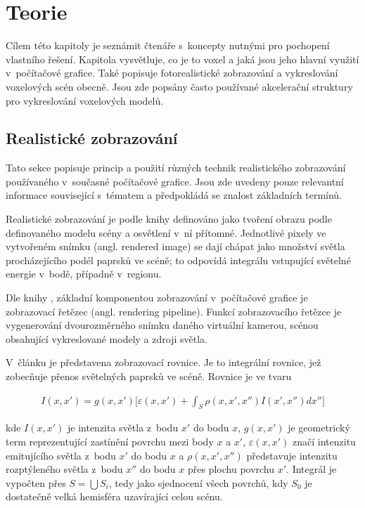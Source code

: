 \chapter{Teorie}
\label{teorie}
Cílem této kapitoly je seznámit čtenáře s~koncepty nutnými pro pochopení vlastního řešení. Kapitola vysvětluje, co je to voxel a jaká jsou jeho hlavní využití v~počítačové grafice. Také popisuje fotorealistické zobrazování a vykreslování voxelových scén obecně. Jsou zde popsány často používané akcelerační struktury pro vykreslování voxelových modelů.

\section{Realistické zobrazování}
Tato sekce popisuje princip a použití různých technik realistického zobrazování používaného v~současné počítačové grafice. Jsou zde uvedeny pouze relevantní informace související s~tématem a předpokládá se znalost základních termínů.

Realistické zobrazování je podle knihy \cite{gfx_principles_practice} definováno jako tvoření obrazu podle definovaného modelu scény a osvětlení v~ní přítomné. Jednotlivé pixely ve vytvořeném snímku (angl. rendered image) se dají chápat jako množství světla procházejícího podél paprsků ve scéně; to odpovídá integrálu vstupující světelné energie v~bodě, případně v~regionu.

Dle knihy \cite{real_time_render}, základní komponentou zobrazování v~počítačové grafice je zobrazovací řetězec (angl. rendering pipeline). Funkcí zobrazovacího řetězce je vygenerování dvourozměrného snímku daného virtuální kamerou, scénou obsahující vykreslované modely a zdroji světla.

V~článku \cite{render_eq} je představena zobrazovací rovnice. Je to integrální rovnice, jež zobecňuje přenos světelných paprsků ve scéně. Rovnice je ve tvaru

\begin{equation} \label{eq:render}
	\begin{gathered}
		I(x, x') = g(x, x') \Big[\varepsilon(x, x') + \int_S\rho(x, x', x'')I(x', x'')dx''\Big]
	\end{gathered}
\end{equation}

kde $I(x, x')$ je intenzita světla z~bodu $x'$ do bodu $x$, $g(x, x')$ je geometrický term reprezentující zastínění povrchu mezi body $x$ a $x'$, $\varepsilon(x, x')$ značí intenzitu emitujícího světla z~bodu $x'$ do bodu $x$ a $\rho(x, x', x'')$ představuje intenzitu rozptýleného světla z~bodu $x''$ do bodu $x$ přes plochu povrchu $x'$. Integrál je vypočten přes $S = \bigcup S_i$, tedy jako sjednocení všech povrchů, kdy $S_0$ je dostatečně velká hemisféra uzavírající celou scénu.

